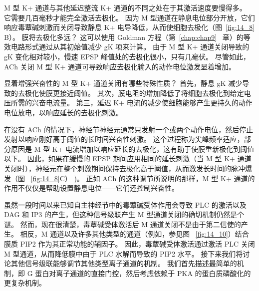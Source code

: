 M 型 K+ 通道与其他延迟整流 K+ 通道的不同之处在于其激活速度要慢得多。
它需要几百毫秒才能完全激活去极化。
因为 M 型通道在静息电位部分开放，它们响应毒蕈碱刺激而关闭导致静息 K+ 电导降低，从而使细胞去极化（图~\ref{fig:14_8} B）。
膜将去极化多远？
这可以使用 Goldman 方程（第~\ref{chap:chap9} ~章）的等效电路形式通过从其初始值减少 gK 项来计算。
由于 M 型 K+ 通道关闭导致的 gK 变化相对较小，慢速 EPSP 峰值处的去极化很小，只有几毫伏。
尽管如此，ACh 关闭 M 型 K+ 通道可导致响应去极化输入的动作电位激发显着增加。


显着增强兴奋性的 M 型 K+ 通道关闭有哪些特殊性质？
首先，静息 gK 减少导致的去极化使膜更接近阈值。
其次，膜电阻的增加降低了将细胞去极化到给定电压所需的兴奋电流量。
第三，延迟 K+ 电流的减少使细胞能够产生更持久的动作电位放电，以响应延长的去极化刺激。


在没有 ACh 的情况下，神经节神经元通常只发射一个或两个动作电位，然后停止发射以响应刚好高于阈值的长时间兴奋性刺激。
这个过程称为尖峰频率适应，部分原因是 M 型 K+ 电流增加以响应延长的去极化，这有助于使膜重新极化到阈值以下。
因此，如果在缓慢的 EPSP 期间应用相同的延长刺激（当 M 型 K+ 通道关闭时），神经元在整个刺激期间保持去极化高于阈值，从而激发长时间的脉冲爆发（图 ~\ref{fig:14_8}C） )。
正如 ACh 的这种调节所说明的那样，M 型 K+ 通道的作用不仅仅是帮助设置静息电位——它们还控制兴奋性。


虽然一段时间以来已知自主神经节中的毒蕈碱受体作用会导致 PLC 的激活以及 DAG 和 IP3 的产生，但这种信号级联产生 M 型通道关闭的确切机制仍然是个谜。
然而，现在很清楚，毒蕈碱受体激活后 M 通道关闭不是由于第二信使的产生。
相反，M 通道以及许多其他类型的通道（例如，参见图 ~\ref{fig:14_10}）结合膜质 PIP2 作为其正常功能的辅因子。
因此，毒蕈碱受体激活通过激活 PLC 关闭 M 型通道，从而降低膜中由于 PLC 水解而导致的 PIP2 水平。
接下来我们将讨论其他信号级联能够调节其他类型离子通道的机制。
我们首先描述最简单的机制，即 G 蛋白对离子通道的直接门控，然后考虑依赖于 PKA 的蛋白质磷酸化的更复杂机制。


